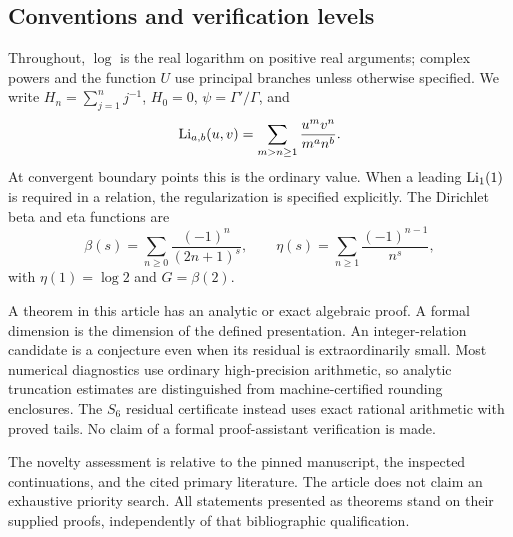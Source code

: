 \subsection{Conventions and verification levels}

Throughout, \(\log\) is the real logarithm on positive real arguments;
complex powers and the function \(U\) use principal branches unless
otherwise specified. We write \(H_n=\sum_{j=1}^n j^{-1}\), \(H_0=0\),
\(\psi=\Gamma'/\Gamma\), and
\[
 \operatorname{Li}_{a,b}(u,v)=\sum_{m>n\geq1}\frac{u^m v^n}{m^a n^b}.
\]
At convergent boundary points this is the ordinary value. When a
leading \(\operatorname{Li}_1(1)\) is required in a relation, the regularization is
specified explicitly. The Dirichlet beta and eta functions are
\[
 \beta(s)=\sum_{n\geq0}\frac{(-1)^n}{(2n+1)^s},\qquad
 \eta(s)=\sum_{n\geq1}\frac{(-1)^{n-1}}{n^s},
\]
with \(\eta(1)=\log2\) and \(G=\beta(2)\).

A theorem in this article has an analytic or exact algebraic proof.
A formal dimension is the dimension of the defined presentation.
An integer-relation candidate is a conjecture even when its residual
is extraordinarily small. Most numerical diagnostics use ordinary
high-precision arithmetic, so analytic truncation estimates are
distinguished from machine-certified rounding enclosures. The
\(S_6\) residual certificate instead uses exact rational arithmetic
with proved tails. No claim
of a formal proof-assistant verification is made.

The novelty assessment is relative to the pinned manuscript, the
inspected continuations, and the cited primary literature. The article
does not claim an exhaustive priority search. All statements presented
as theorems stand on their supplied proofs, independently of that
bibliographic qualification.

